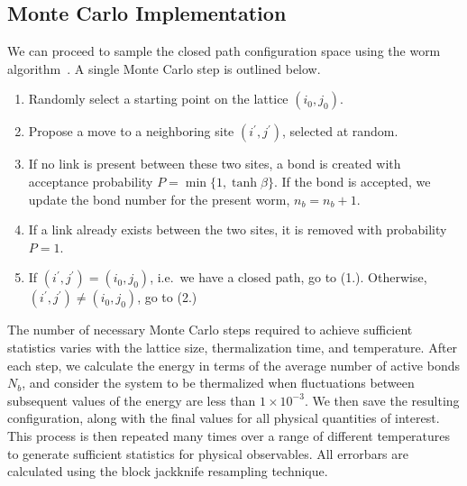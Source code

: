 \documentclass[../main.tex]{subfiles}
\begin{document}
\subsection{Monte Carlo Implementation}%
\label{ssec:monte_carlo_implementation}
We can proceed to sample the closed path configuration space using the worm
algorithm~\cite{prok87}.
%
A single Monte Carlo step is outlined below.
%
\begin{enumerate}
    \item Randomly select a starting point on the lattice $(i_0, j_0)$.
    \item Propose a move to a neighboring site $(i^{\prime}, j^{\prime})$,
        selected at random.
    \item If no link is present between these two sites, a bond is created with
        acceptance probability $P = \min\{1, \tanh{\beta}\}$. If the bond is
        accepted, we update the bond number for the present worm, $n_b = n_b +
        1$.
    \item If a link already exists between the two sites, it is removed with
        probability $P = 1$.
    \item If $(i^{\prime}, j^{\prime}) = (i_0, j_0)$, i.e.\ we have a closed
        path, go to (1.). Otherwise, $(i^{\prime}, j^{\prime}) \neq (i_0,
        j_0)$, go to (2.)
\end{enumerate}
%
The number of necessary Monte Carlo steps required to achieve sufficient
statistics varies with the lattice size, thermalization time, and temperature.
%
After each step, we calculate the energy in terms of the average number of
active bonds $N_b$, and consider the system to be thermalized when fluctuations
between subsequent values of the energy are less than $1\times10^{-3}$.
%
We then save the resulting configuration, along with the final values for all
physical quantities of interest.
%
This process is then repeated many times over a range of different temperatures
to generate sufficient statistics for physical observables.
%
All errorbars are calculated using the block jackknife resampling technique. 
%
\end{document}
